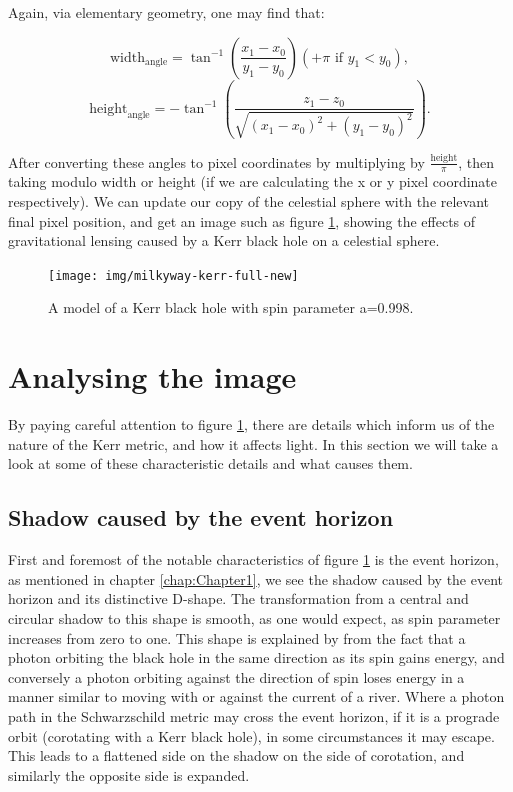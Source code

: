 \documentclass[oneside,openright,frontopenright, singlespacing]{dmathesis}
\begin{document}
\vspace{1em}
	Again, via elementary geometry, one may find that:

	\[\mbox{width}_{\mbox{angle}} = \tan^{-1}\left(\frac{x_1-x_0}{y_1-y_0}\right) (+\pi \mbox{ if } y_1<y_0),\]
	\[\mbox{height}_{\mbox{angle}} = -\tan^{-1}\left(\frac{z_1-z_0}{\sqrt{(x_1-x_0)^2+(y_1-y_0)^2}}\right).\]

	After converting these angles to pixel coordinates by multiplying by $\frac{\mbox{height}}{\pi}$, then taking modulo width or height (if we are calculating the x or y pixel coordinate respectively). We can update our copy of the celestial sphere with the relevant final pixel position, and get an image such as figure \ref{fig:Figure4.3}, showing the effects of gravitational lensing caused by a Kerr black hole on a celestial sphere.

\begin{figure}[!ht]
	\centering
	\texttt{[image: img/milkyway-kerr-full-new]}
	\caption{A model of a Kerr black hole with spin parameter a=0.998.}
	\label{fig:Figure4.3}
\end{figure}

\section{Analysing the image}\label{sec:Section4.8}

	By paying careful attention to figure \ref{fig:Figure4.3}, there are details which inform us of the nature of the Kerr metric, and how it affects light. In this section we will take a look at some of these characteristic details and what causes them. 

\subsection{Shadow caused by the event horizon}\label{subsec:Subsection4.8.1}

\vspace{1em}
	First and foremost of the notable characteristics of figure \ref{fig:Figure4.3} is the event horizon, as mentioned in chapter \ref{chap:Chapter1}, we see the shadow caused by the event horizon and its distinctive D-shape. The transformation from a central and circular shadow to this shape is smooth, as one would expect, as spin parameter increases from zero to one. This shape is explained by from the fact that a photon orbiting the black hole in the same direction as its spin gains energy, and conversely a photon orbiting against the direction of spin loses energy in a manner similar to moving with or against the current of a river. Where a photon path in the Schwarzschild metric may cross the event horizon, if it is a prograde orbit (corotating with a Kerr black hole), in some circumstances it may escape. This leads to a flattened side on the shadow on the side of corotation, and similarly the opposite side is expanded.
\end{document}
